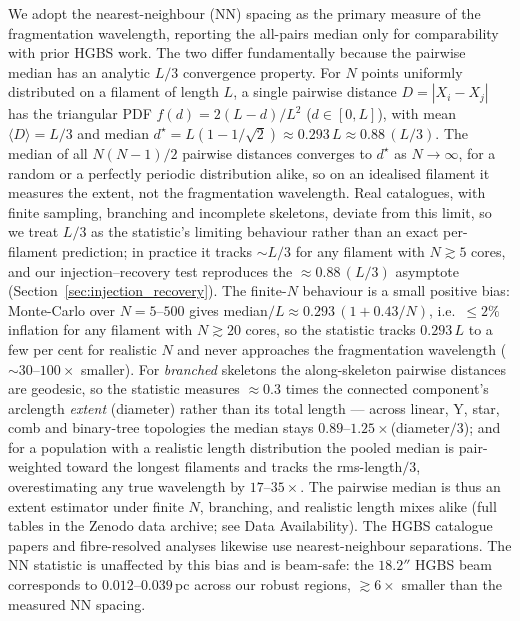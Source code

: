 \documentclass[usenatbib,twoside,twocolumn]{mnras}
\begin{document}
We adopt the nearest-neighbour (NN) spacing as the primary measure of the fragmentation wavelength, reporting the all-pairs median only for comparability with prior HGBS work. The two differ fundamentally because the pairwise median has an analytic $L/3$ convergence property. For $N$ points uniformly distributed on a filament of length $L$, a single pairwise distance $D=|X_i-X_j|$ has the triangular PDF $f(d)=2(L-d)/L^2$ ($d\in[0,L]$), with mean $\langle D\rangle=L/3$ and median $d^\star=L(1-1/\sqrt{2})\approx0.293\,L\approx0.88\,(L/3)$. The median of all $N(N-1)/2$ pairwise distances converges to $d^\star$ as $N\to\infty$, for a random or a perfectly periodic distribution alike, so on an idealised filament it measures the extent, not the fragmentation wavelength. Real catalogues, with finite sampling, branching and incomplete skeletons, deviate from this limit, so we treat $L/3$ as the statistic's limiting behaviour rather than an exact per-filament prediction; in practice it tracks $\sim L/3$ for any filament with $N\gtrsim5$ cores, and our injection--recovery test reproduces the $\approx0.88\,(L/3)$ asymptote (Section~\ref{sec:injection_recovery}). The finite-$N$ behaviour is a small positive bias: Monte-Carlo over $N=5$--$500$ gives median$/L\approx0.293\,(1+0.43/N)$, i.e.\ $\le2\%$ inflation for any filament with $N\gtrsim20$ cores, so the statistic tracks $0.293\,L$ to a few per cent for realistic $N$ and never approaches the fragmentation wavelength ($\sim30$--$100\times$ smaller). For \emph{branched} skeletons the along-skeleton pairwise distances are geodesic, so the statistic measures $\approx0.3$ times the connected component's arclength \emph{extent} (diameter) rather than its total length --- across linear, Y, star, comb and binary-tree topologies the median stays $0.89$--$1.25\times$(diameter$/3$); and for a population with a realistic length distribution the pooled median is pair-weighted toward the longest filaments and tracks the rms-length$/3$, overestimating any true wavelength by $17$--$35\times$. The pairwise median is thus an extent estimator under finite $N$, branching, and realistic length mixes alike (full tables in the Zenodo data archive; see Data Availability). The HGBS catalogue papers \citep{Konyves2015,Konyves2020} and fibre-resolved analyses \citep{Hacar2013,Hacar2018} likewise use nearest-neighbour separations. The NN statistic is unaffected by this bias and is beam-safe: the $18.2''$ HGBS beam corresponds to $0.012$--$0.039$\,pc across our robust regions, $\gtrsim6\times$ smaller than the measured NN spacing.
\end{document}
